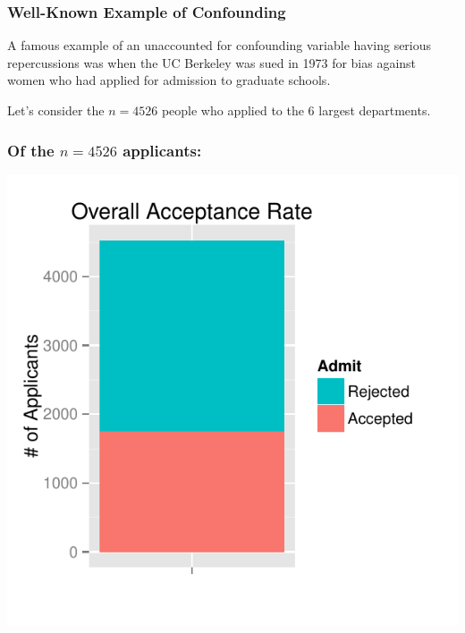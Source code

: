 \documentclass[handout]{beamer}
\begin{document}
\begin{frame}
\frametitle{Well-Known Example of Confounding}

A famous example of an unaccounted for confounding variable having serious repercussions was when the UC Berkeley was sued in 1973 for bias against women who had applied for admission to graduate schools. 

\vskip 0.5cm

\pause Let's consider the $n=4526$ people who applied to the 6 largest departments.

\end{frame}



\begin{frame}
\frametitle{Of the $n=4526$ applicants:}

\begin{center}
\includegraphics[height=\textheight]{figure/overall.pdf}
\end{center}

\end{frame}
\end{document}
